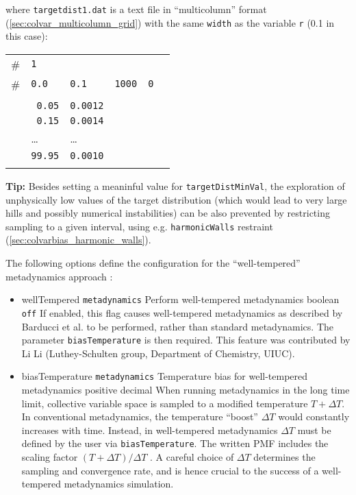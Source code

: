 \noindent{}where \texttt{targetdist1.dat} is a text file in ``multicolumn'' format (\ref{sec:colvar_multicolumn_grid}) with the same \texttt{width} as the variable \texttt{r} (0.1 in this case):\\
\begin{tabular}{l l l l l l}
\\
\# & \texttt{1} & & & & \\
\# & \texttt{0.0} & \texttt{0.1} & \texttt{1000} & \texttt{0} \\
\\
& \texttt{ 0.05} & \texttt{0.0012} \\
& \texttt{ 0.15} & \texttt{0.0014} \\
& \ldots & \ldots\\
& \texttt{99.95} &  \texttt{0.0010} \\
\\
\end{tabular}

\textbf{Tip:} Besides setting a meaninful value for \texttt{targetDistMinVal}, the exploration of unphysically low values of the target distribution (which would lead to very large hills and possibly numerical instabilities) can be also prevented by restricting sampling to a given interval, using e.g.{} \texttt{harmonicWalls} restraint (\ref{sec:colvarbias_harmonic_walls}).




The following options define the configuration for the ``well-tempered'' metadynamics approach \cite{Barducci2008}:

\begin{itemize}
\item %
  \keydef
    {wellTempered}{%
    \texttt{metadynamics}}{%
    Perform well-tempered metadynamics}{%
    boolean}{%
    \texttt{off}}{%
    If enabled, this flag causes well-tempered metadynamics as
    described by Barducci et al.\cite{Barducci2008}
    to be performed, rather than standard metadynamics.  The parameter
    \texttt{biasTemperature} is then required.
    This feature was contributed by Li Li (Luthey-Schulten group, Department of Chemistry, UIUC).}

\item %
  \key
    {biasTemperature}{%
    \texttt{metadynamics}}{%
    Temperature bias for well-tempered metadynamics}{%
    positive decimal}{%
    When running metadynamics in the long time limit, collective variable space is sampled to a modified
    temperature $T+\Delta T$.  In conventional metadynamics, the temperature ``boost'' $\Delta T$ would
    constantly increases with time.  Instead, in well-tempered metadynamics $\Delta T$ must be defined by the
    user via \texttt{biasTemperature}.  The written PMF includes the
    scaling factor $(T+\Delta T)/\Delta T$ \cite{Barducci2008}.  A careful choice of $\Delta T$ determines the
    sampling and convergence rate, and is hence crucial to the success of a well-tempered metadynamics
    simulation.}
\end{itemize}


